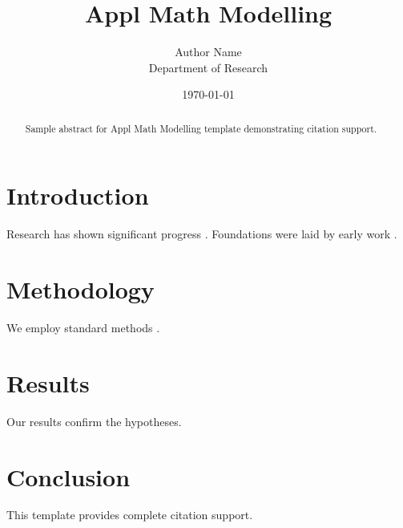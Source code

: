 ﻿\documentclass{elsarticle}
\title{Appl Math Modelling}
\author{Author Name \\ \small Department of Research}
\date{\today}
\begin{document}
\maketitle

\begin{abstract}
Sample abstract for Appl Math Modelling template demonstrating citation support.
\end{abstract}

\section{Introduction}
Research has shown significant progress \citep{einstein1905}. Foundations were laid by early work \citep{turing1950}.

\section{Methodology}
We employ standard methods \citep{knuth1984}.

\section{Results}
Our results confirm the hypotheses.

\section{Conclusion}
This template provides complete citation support.



\end{document}

